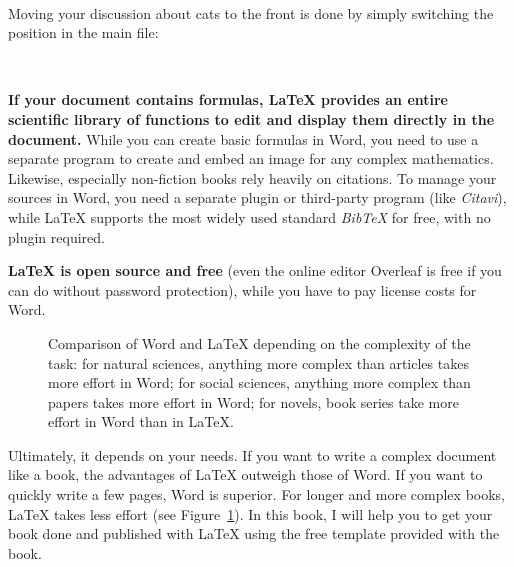 \begin{lstlisting}


\end{lstlisting}

Moving your discussion about cats to the front is done by simply switching the position in the main file:

\begin{lstlisting}


\end{lstlisting}

\textbf{If your document contains formulas, LaTeX provides an entire scientific library of functions to edit and display them directly in the document.} While you can create basic formulas in Word, you need to use a separate program to create and embed an image for any complex mathematics. Likewise, especially non-fiction books rely heavily on citations. To manage your sources in Word, you need a separate plugin or third\hyp{}party program (like \textit{Citavi}), while LaTeX supports the most widely used standard \textit{BibTeX} for free, with no plugin required.



\textbf{LaTeX is open source and free} (even the online editor Overleaf is free if you can do without password protection), while you have to pay license costs for Word.

\begin{figure}[H]\centering

\caption{Comparison of Word and LaTeX depending on the complexity of the task: for natural sciences, anything more complex than articles takes more effort in Word; for social sciences, anything more complex than papers takes more effort in Word; for novels, book series take more effort in Word than in LaTeX.}
\label{latex-effort-writing-complexity:fig}
\end{figure}

Ultimately, it depends on your needs. If you want to write a complex document like a book, the advantages of LaTeX outweigh those of Word. If you want to quickly write a few pages, Word is superior. For longer and more complex books, LaTeX takes less effort (see Figure~\ref{latex-effort-writing-complexity:fig}). In this book, I will help you to get your book done and published with LaTeX using the free template provided with the book.

